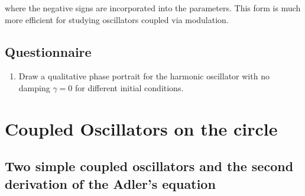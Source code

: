 \documentclass{article}
\begin{document}
where the negative signs are incorporated into the parameters. This form is much more efficient for studying oscillators coupled via modulation.


\subsection{Questionnaire}
\begin{enumerate}
\item Draw a qualitative phase portrait for the harmonic oscillator with no damping $\gamma=0$ for different initial conditions.
\end{enumerate}


\section{Coupled Oscillators on the circle}

\subsection{Two simple coupled oscillators and the second derivation of the Adler's equation}
\end{document}
